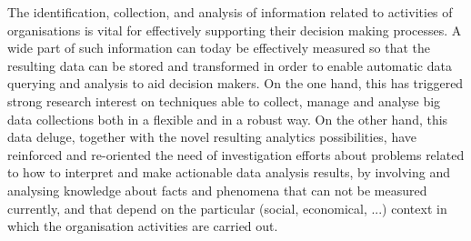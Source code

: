 

The identification, collection, and analysis of information related to activities of organisations is vital for effectively supporting their decision making processes. A wide part of such information can today be effectively measured so that the resulting data can be stored and transformed in order to enable automatic data querying and  analysis to aid decision makers. On the one hand, this has triggered strong research interest on techniques able to collect,  manage and analyse big data collections both in a flexible and in a robust way.  On the other hand, this data  deluge, together with  the novel resulting analytics possibilities,  have reinforced and re-oriented the need of  investigation efforts about problems related to how to interpret and make actionable data analysis results, by  involving  and analysing knowledge about facts and phenomena that can not be measured currently, and that depend on the particular (social, economical, ...) context in which the organisation activities are carried out.  

